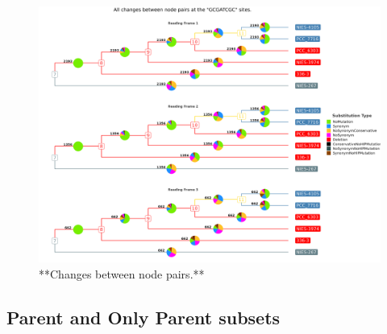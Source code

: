 \documentclass[
]{book}
\begin{document}
\begin{figure}
\includegraphics[width=1\linewidth]{figures/ALL_SITES_All_codon_mutations_tree} \caption{**Changes between node pairs.**}\label{fig:FIG10x}
\end{figure}

\hypertarget{parent-and-only-parent-subsets-1}{%
\subsection{Parent and Only Parent subsets}\label{parent-and-only-parent-subsets-1}}
\end{document}
